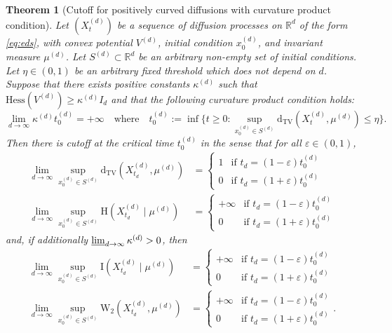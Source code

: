 \documentclass[10pt,reqno]{amsart}
\newtheorem{theorem}{Theorem}[section]
\numberwithin{equation}{section}
\newcommand{\DTV}{\mathrm{d}_{\mathrm{TV}}}
\begin{document}
\begin{theorem}[Cutoff for positively curved diffusions with curvature product condition]\label{th:prodcondcut}
  Let $(X_t^{(d)})$ be a sequence of diffusion processes on $\mathbb{R}^d$ of
  the form \eqref{eq:eds}, with convex potential $V^{(d)}$, initial condition
  $x_0^{(d)}$, and invariant measure $\mu^{(d)}$. Let
  $S^{(d)}\subset\mathbb{R}^d$ be an arbitrary non-empty set of initial
  conditions. Let $\eta\in(0,1)$ be an arbitrary fixed threshold which does
  not depend on $d$. Suppose that there exists positive constants
  $\kappa^{(d)}$ such that $\mathrm{Hess}(V^{(d)})\geq\kappa^{(d)}I_d$ and
  that the following curvature product condition holds:
  \[
    \lim_{d\to\infty}\kappa^{(d)}t_0^{(d)}=+\infty
    \quad\text{where}\quad
    t_0^{(d)} := \inf\bigl\{t \geq 0:\sup_{x_0^{(d)} \in S^{(d)}} \DTV(X_t^{(d)}, \mu^{(d)}) \leq\eta\bigr\}.
  \]
  Then there is cutoff at the critical time $t_0^{(d)}$ in the sense that for all $\varepsilon\in(0,1)$, 
  \begin{align}
    \lim_{d\to\infty}
    \sup_{x^{(d)}_0\in S^{(d)}}
    \DTV(X^{(d)}_{t_d},\mu^{(d)})
    &=
      \begin{cases}
        1 & \text{if $t_d=(1-\varepsilon)t_0^{(d)}$}\\
        0 & \text{if $t_d=(1+\varepsilon)t_0^{(d)}$}
      \end{cases}\\     
    \lim_{d\to\infty}
    \sup_{x^{(d)}_0\in S^{(d)}}
    \mathrm{H}(X^{(d)}_{t_d}\mid\mu^{(d)})
    &=
      \begin{cases}
        +\infty & \text{if $t_d=(1-\varepsilon)t_0^{(d)}$}\\
        0 & \text{if $t_d=(1+\varepsilon)t_0^{(d)}$}
      \end{cases}
  \end{align}
  and, if additionally $\varliminf_{d\to\infty}\kappa^{(d)}>0$, then
  \begin{align}
    \lim_{d\to\infty} \sup_{x^{(d)}_0\in S^{(d)}} \mathrm{I}(X^{(d)}_{t_d}\mid\mu^{(d)})
    &=
      \begin{cases}
        +\infty & \text{if $t_d=(1-\varepsilon)t_0^{(d)}$}\\
        0 & \text{if $t_d=(1+\varepsilon)t_0^{(d)}$}
      \end{cases}\\
    \lim_{d\to\infty}
    \sup_{x^{(d)}_0\in S^{(d)}}
    \mathrm{W}_2(X^{(d)}_{t_d},\mu^{(d)})
    &=
      \begin{cases}
        +\infty & \text{if $t_d=(1-\varepsilon)t_0^{(d)}$}\\
        0 & \text{if $t_d=(1+\varepsilon)t_0^{(d)}$}
      \end{cases}.
  \end{align}
\end{theorem}
\end{document}
